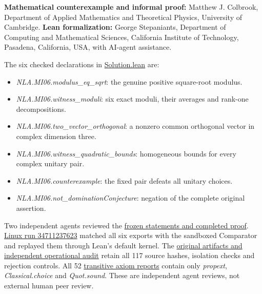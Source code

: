 \documentclass[11pt,a4paper]{article}
\providecommand{\tightlist}{\setlength{\itemsep}{0pt}\setlength{\parskip}{0pt}}
\begin{document}
\textbf{Mathematical counterexample and informal proof:} Matthew J.
Colbrook, Department of Applied Mathematics and Theoretical Physics,
University of Cambridge. \textbf{Lean formalization:} George
Stepaniants, Department of Computing and Mathematical Sciences,
California Institute of Technology, Pasadena, California, USA, with
AI-agent assistance.

The six checked declarations in
\href{https://github.com/sgstepaniants/OpenProblemsInNLA/blob/43b3dc65116633a68c32ec582fd093f3adc95597/matrix-inequalities-and-norms/MI-06/lean/Solution.lean}{Solution.lean}
are:

\begin{itemize}
\tightlist
\item
  \textit{NLA.MI06.modulus\_eq\_sqrt}: the genuine positive square-root
  modulus.
\item
  \textit{NLA.MI06.witness\_moduli}: six exact moduli, their averages
  and rank-one decompositions.
\item
  \textit{NLA.MI06.two\_vector\_orthogonal}: a nonzero common orthogonal
  vector in complex dimension three.
\item
  \textit{NLA.MI06.witness\_quadratic\_bounds}: homogeneous bounds for
  every complex unitary pair.
\item
  \textit{NLA.MI06.counterexample}: the fixed pair defeats all unitary
  choices.
\item
  \textit{NLA.MI06.not\_dominationConjecture}: negation of the complete
  original assertion.
\end{itemize}

Two independent agents reviewed the
\href{https://github.com/ajt60gaibb/OpenProblemsInNLA/blob/main/matrix-inequalities-and-norms/MI-06/lean/reviews}{frozen
statements and completed proof}.
\href{https://github.com/sgstepaniants/OpenProblemsInNLA/actions/runs/34711237623}{Linux
run 34711237623} matched all six exports with the sandboxed Comparator
and replayed them through Lean's default kernel. The
\href{https://github.com/ajt60gaibb/OpenProblemsInNLA/blob/main/matrix-inequalities-and-norms/MI-06/lean/verification/linux-2026-09-12}{original
artifacts and independent operational audit} retain all 117 source
hashes, isolation checks and rejection controls. All 52
\href{https://github.com/ajt60gaibb/OpenProblemsInNLA/blob/main/matrix-inequalities-and-norms/MI-06/lean/reviews/proof-build.log}{transitive
axiom reports} contain only \textit{propext}, \textit{Classical.choice}
and \textit{Quot.sound}. These are independent agent reviews, not
external human peer review.
\end{document}
